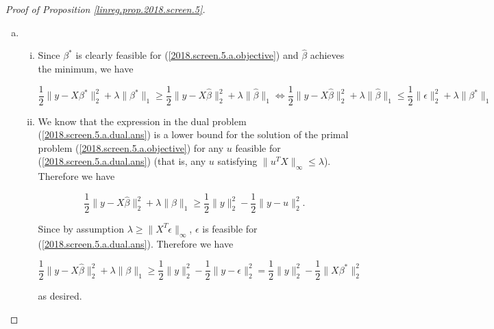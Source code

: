 \begin{proof}[Proof of Proposition \ref{linreg.prop.2018.screen.5}]
\begin{enumerate}[(a)]
\begin{enumerate}[(i)]
\item \textbf{Necessarily unique} (except in the trivial case \(\lambda=0\)). This is immediate from Proposition \ref{linreg.2018.screen.5.b.iv.prop}.


\end{enumerate}

\item 

\begin{enumerate}[(i)]

\item Since \(\beta^*\) is clearly feasible for (\ref{2018.screen.5.a.objective}) and \(\hat{\beta}\) achieves the minimum, we have

\[
\frac{1}{2} \lVert y - X \beta^* \rVert_2^2 + \lambda \lVert \beta^* \rVert_1 \geq \frac{1}{2} \lVert y - X \hat{\beta} \rVert_2^2 + \lambda \lVert \hat{\beta} \rVert_1 \iff  \frac{1}{2} \lVert y - X \hat{\beta} \rVert_2^2 + \lambda \lVert \hat{\beta} \rVert_1 \leq \frac{1}{2} \lVert\epsilon \rVert_2^2 + \lambda \lVert \beta^* \rVert_1
\]


\item


We know that the expression in the dual problem (\ref{2018.screen.5.a.dual.ans}) is a lower bound for the solution of the primal problem (\ref{2018.screen.5.a.objective}) for any \(u\) feasible for (\ref{2018.screen.5.a.dual.ans}) (that is, any \(u\) satisfying \(\lVert u^TX \rVert_\infty \leq \lambda\)). Therefore we have

\[
\frac{1}{2} \lVert y - X \hat{\beta} \rVert_2^2 + \lambda \lVert \beta \rVert_1 \geq  \frac{1}{2} \lVert y \rVert_2^2 - \frac{1}{2} \lVert y - u \rVert_2^2.
\]

Since by assumption \(\lambda \geq \lVert X^T \epsilon \rVert_\infty\), \(\epsilon\) is feasible for (\ref{2018.screen.5.a.dual.ans}). Therefore we have

\begin{equation}\label{2018.screen.5.c.ii.result}
\frac{1}{2} \lVert y - X \hat{\beta} \rVert_2^2 + \lambda \lVert \beta \rVert_1 \geq  \frac{1}{2} \lVert y \rVert_2^2 - \frac{1}{2} \lVert y - \epsilon \rVert_2^2 =  \frac{1}{2} \lVert y \rVert_2^2 - \frac{1}{2} \lVert X \beta^* \rVert_2^2
\end{equation}

as desired.



\end{enumerate}
\end{enumerate}
\end{proof}

